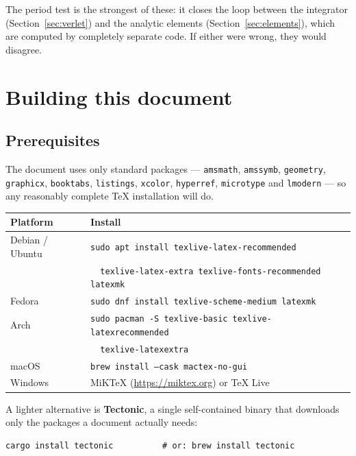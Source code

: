 \documentclass[11pt,a4paper]{article}
\begin{document}
The period test is the strongest of these: it closes the loop between the
integrator (Section~\ref{sec:verlet}) and the analytic elements
(Section~\ref{sec:elements}), which are computed by completely separate code. If
either were wrong, they would disagree.

\section{Building this document}
\label{sec:building}

\subsection{Prerequisites}

The document uses only standard packages --- \texttt{amsmath}, \texttt{amssymb},
\texttt{geometry}, \texttt{graphicx}, \texttt{booktabs}, \texttt{listings},
\texttt{xcolor}, \texttt{hyperref}, \texttt{microtype} and \texttt{lmodern} ---
so any reasonably complete \TeX{} installation will do.

\begin{center}
\begin{tabular}{@{}ll@{}}
\toprule
\textbf{Platform} & \textbf{Install}\\
\midrule
Debian / Ubuntu & \texttt{sudo apt install texlive-latex-recommended} \\
                & \texttt{\ \ texlive-latex-extra texlive-fonts-recommended latexmk}\\
Fedora          & \texttt{sudo dnf install texlive-scheme-medium latexmk}\\
Arch            & \texttt{sudo pacman -S texlive-basic texlive-latexrecommended}\\
                & \texttt{\ \ texlive-latexextra}\\
macOS           & \texttt{brew install --cask mactex-no-gui}\\
Windows         & MiKTeX (\url{https://miktex.org}) or TeX Live\\
\bottomrule
\end{tabular}
\end{center}

\medskip
\noindent
A lighter alternative is \textbf{Tectonic}, a single self-contained binary that
downloads only the packages a document actually needs:

\begin{lstlisting}
cargo install tectonic          # or: brew install tectonic
\end{lstlisting}
\end{document}
